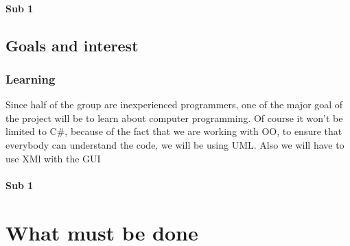 \documentclass[article]{report}
\begin{document}
									  \subsection{Sub 1}
						\chapter{Goals and interest}
								\section{Learning}
										Since half of the group are inexperienced programmers, one of the major goal of the project will be to learn about computer programming.\newline
										Of course it won't be limited to C\#, because of the fact that we are working with OO, to ensure that everybody can understand the code, we will be using UML.\newline
										Also we will have to use XMl with the GUI
									  \subsection{Sub 1}
     		\part{What must be done}
     		
\end{document}

